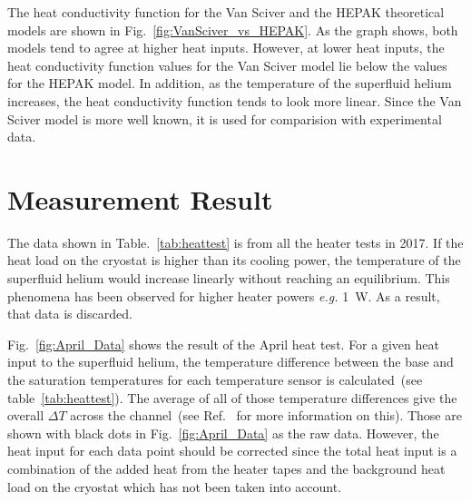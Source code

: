 The heat conductivity function for the Van Sciver and the HEPAK
theoretical models are shown in Fig.~\ref{fig:VanSciver_vs_HEPAK}. As
the graph shows, both models tend to agree at higher heat
inputs. However, at lower heat inputs, the heat conductivity function
values for the Van Sciver model lie below the values for the HEPAK
model. In addition, as the temperature of the superfluid helium
increases, the heat conductivity function tends to look more
linear. Since the Van Sciver model is more well known, it is used for
comparision with experimental data.

\section{Measurement Result}
The data shown in Table.~\ref{tab:heattest} is from all the heater
tests in 2017. If the heat load on the cryostat is higher than its
cooling power, the temperature of the superfluid helium would increase
linearly without reaching an equilibrium. This phenomena has been
observed for higher heater powers {\it{e.g.}} 1~W. As a result, that
data is discarded.


Fig.~\ref{fig:April_Data} shows the result of the April heat test.
For a given heat input to the superfluid helium, the temperature
difference between the base and the saturation temperatures for each
temperature sensor is calculated~(see table~\ref{tab:heattest}). The
average of all of those temperature differences give the overall
$\Delta T$ across the channel~(see Ref.~\cite{Florian_thesis} for more
information on this). Those are shown with black dots in
Fig.~\ref{fig:April_Data} as the raw data. However, the heat input for
each data point should be corrected since the total heat input is a
combination of the added heat from the heater tapes and the background
heat load on the cryostat which has not been taken into account.


